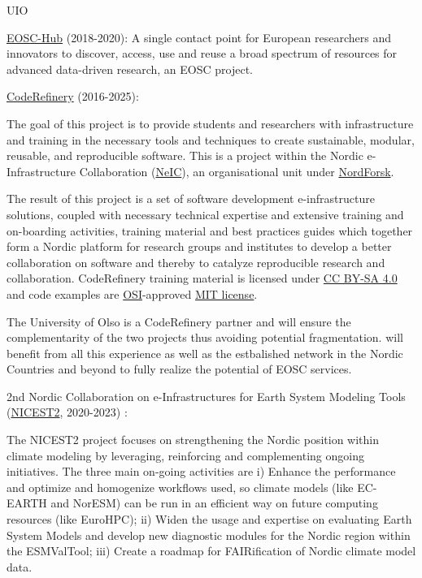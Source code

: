 \begin{sitedescription}{UIO}
\begin{compactenum}
    \item \href{https://www.eosc-hub.eu}{EOSC-Hub} \label{desc:eoschub} (2018-2020):
    A single contact point for European researchers and innovators to discover, access, use and reuse a broad spectrum of resources for advanced data-driven research, an EOSC project.

    \item \href{https://coderefinery.org}{CodeRefinery} \label{desc:coderefinery} (2016-2025):

    The goal of this project is to provide students and researchers with infrastructure and training in the necessary tools and techniques to create sustainable, modular, reusable, and reproducible software.
    This is a project within the Nordic e-Infrastructure Collaboration (\href{https://neic.no}{NeIC}), an organisational unit under \href{https://www.nordforsk.org/en}{NordForsk}.

    The result of this project is a set of software development e-infrastructure solutions, coupled with necessary technical expertise and extensive training and on-boarding activities, training material and best practices guides which together form a Nordic platform for research groups and institutes to develop a better collaboration on software and thereby to catalyze reproducible research and collaboration.
    \newline
    CodeRefinery training material is licensed under \href{https://creativecommons.org/licenses/by-sa/4.0/}{CC BY-SA 4.0} and code examples are \href{https://opensource.org/}{OSI}-approved \href{https://opensource.org/licenses/mit-license.html}{MIT license}.

    The University of Olso is a CodeRefinery partner and will ensure the complementarity of the two projects thus avoiding potential fragmentation. \TheProject will benefit from all this experience as well as the estbalished network in the Nordic Countries and beyond to fully realize the potential of \TheProject EOSC services.
    \newline


    \item 2nd Nordic Collaboration on e-Infrastructures for Earth System Modeling Tools (\href{https://neic.no/nicest2}{NICEST2}, 2020-2023) \label{desc:nicest2}:

    The NICEST2 project focuses on strengthening the Nordic position within climate modeling by leveraging, reinforcing and complementing ongoing initiatives. The three main on-going activities are i) Enhance the performance and optimize and homogenize workflows used, so climate models (like EC-EARTH and NorESM) can be run in an efficient way on future computing resources (like EuroHPC); ii) Widen the usage and expertise on evaluating Earth System Models and develop new diagnostic modules for the Nordic region within the ESMValTool; iii) Create a roadmap for FAIRification of Nordic climate model data.


\end{compactenum}
\end{sitedescription}
